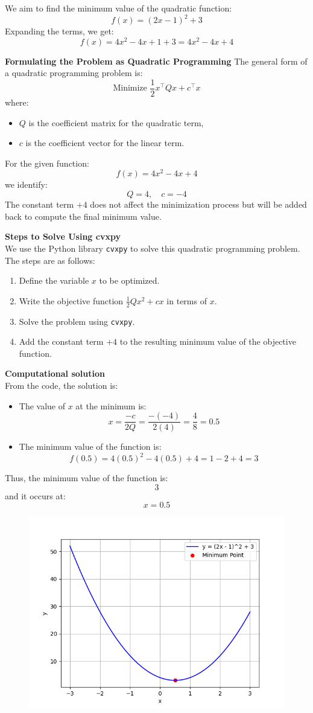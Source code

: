 \documentclass[journal]{IEEEtran}
\begin{document}
We aim to find the minimum value of the quadratic function:
\[
f(x) = (2x - 1)^2 + 3
\]
Expanding the terms, we get:
\[
f(x) = 4x^2 - 4x + 1 + 3 = 4x^2 - 4x + 4
\]

\textbf{Formulating the Problem as Quadratic Programming}
The general form of a quadratic programming problem is:
\[
\text{Minimize } \frac{1}{2}x^\top Q x + c^\top x
\]
where:
\begin{itemize}
    \item \( Q \) is the coefficient matrix for the quadratic term,
    \item \( c \) is the coefficient vector for the linear term.
\end{itemize}

For the given function:
\[
f(x) = 4x^2 - 4x + 4
\]
we identify:
\[
Q = 4, \quad c = -4
\]
The constant term \( +4 \) does not affect the minimization process but will be added back to compute the final minimum value.

\textbf{Steps to Solve Using cvxpy}\\
We use the Python library \texttt{cvxpy} to solve this quadratic programming problem. The steps are as follows:
\begin{enumerate}
    \item Define the variable \( x \) to be optimized.
    \item Write the objective function \( \frac{1}{2} Q x^2 + c x \) in terms of \( x \).
    \item Solve the problem using \texttt{cvxpy}.
    \item Add the constant term \( +4 \) to the resulting minimum value of the objective function.
\end{enumerate}


\textbf{Computational solution}\\
From the code, the solution is:
\begin{itemize}
    \item The value of \( x \) at the minimum is:
    \[
    x = \frac{-c}{2Q} = \frac{-(-4)}{2(4)} = \frac{4}{8} = 0.5
    \]
    \item The minimum value of the function is:
    \[
    f(0.5) = 4(0.5)^2 - 4(0.5) + 4 = 1 - 2 + 4 = 3
    \]
\end{itemize}

Thus, the minimum value of the function is:
\[
\boxed{3}
\]
and it occurs at:
\[
\boxed{x = 0.5}
\] 
 \begin{figure}[ht!]
   \centering
   \includegraphics[width=\columnwidth]{figs/Figure_1.png}
\end{figure}
\end{document}
